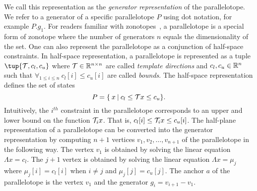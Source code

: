 We call this representation as the \emph{generator representation} of the parallelotope.
%
We refer to a generator of a specific parallelotope $P$ using dot notation, for example $P.g_1$.
%
For readers familiar with zonotopes~\cite{girard2005reachability,althoff2010computing}, a parallelotope is a special form of zonotope where the number of generators $n$ equals the dimensionality of the set.
%
One can also represent the parallelotope as a conjunction of half-space constraints. 
%
In half-space representation, a parallelotope is represented as a tuple $\tup{\T, c_{l}, c_{u}}$ where $\T \in \reals^{n \times n}$ are called \emph{template directions} and $c_{l}, c_{u} \in \reals^{n}$ such that $\forall_{1 \leq i \leq n} ~  c_{l}[i] \leq c_{u}[i]$ are called \emph{bounds}. The half-space representation defines the set of states
%
$$
P = \{\: x\: | \: c_{l} \leq {\cal T} x \leq c_{u} \}.
$$
%
%
Intuitively, the $i^{th}$ constraint in the parallelotope corresponds to an upper and lower bound on the function ${\cal T}_{i} x$.
%
That is, $c_{l}[i] \leq {\cal T}_{i}x \leq c_{u}[i]$.
%
The half-plane representation of a parallelotope can be converted into the generator representation by computing $n+1$ vertices $v_1, v_2, \ldots, v_{n+1}$ of the parallelotope in the following way.
%
The vertex $v_1$ is obtained by solving the linear equation $\Lambda x = c_{l}$.
%
The $j+1$ vertex is obtained by solving the linear equation $\Lambda x = \mu_{j}$ where $\mu_{j}[i] = c_{l}[i]$ when $i \neq j$ and $\mu_{j}[j] = c_{u}[j]$.
%
The anchor $a$ of the parallelotope is the vertex $v_1$ and the generator $g_{i} = v_{i+1} - v_{1}$.

